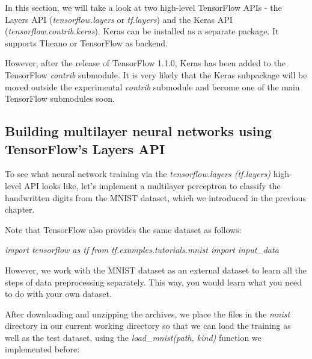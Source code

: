 \documentclass[11pt]{article}
\begin{document}
    In this section, we will take a look at two high-level TensorFlow APIs -
the Layers API (\emph{tensorflow.layers} or \emph{tf.layers}) and the
Keras API (\emph{tensorflow.contrib.keras}). Keras can be installed as a
separate package. It supports Theano or TensorFlow as backend.

However, after the release of TensorFlow 1.1.0, Keras has been added to
the TensorFlow \emph{contrib} submodule. It is very likely that the
Keras subpackage will be moved outside the experimental \emph{contrib}
submodule and become one of the main TensorFlow submodules soon.

    \subsection{Building multilayer neural networks using TensorFlow's
Layers
API}\label{building-multilayer-neural-networks-using-tensorflows-layers-api}

    To see what neural network training via the \emph{tensorflow.layers
(tf.layers)} high-level API looks like, let's implement a multilayer
perceptron to classify the handwritten digits from the MNIST dataset,
which we introduced in the previous chapter.

Note that TensorFlow also provides the same dataset as follows:

\emph{import tensorflow as tf} \emph{from tf.examples.tutorials.mnist
import input\_data}

However, we work with the MNIST dataset as an external dataset to learn
all the steps of data preprocessing separately. This way, you would
learn what you need to do with your own dataset.

After downloading and unzipping the archives, we place the files in the
\emph{mnist} directory in our current working directory so that we can
load the training as well as the test dataset, using the
\emph{load\_mnist(path, kind)} function we implemented before:
\end{document}
